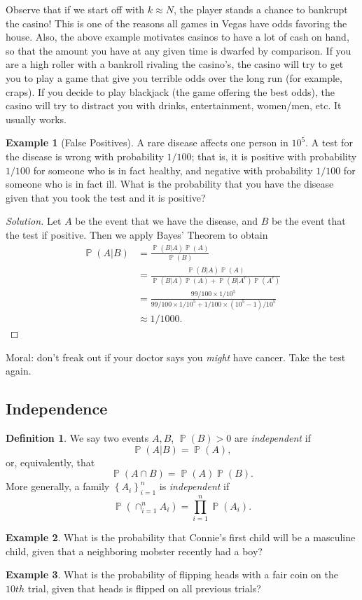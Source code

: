 \documentclass[12pt]{article}
\DeclareMathOperator{\prob}{\mathbb{P}}
\theoremstyle{plain}
\theoremstyle{definition}
\newtheorem*{definition}{Definition}
\newtheorem*{example}{Example}
\theoremstyle{remark}
\numberwithin{equation}{section}  %
\begin{document}
Observe that if we start off with $k \approx N$, the player stands a chance to
bankrupt the casino! This is one of the reasons all games in Vegas have odds
favoring the house. Also, the above example motivates casinos to have a lot of
cash on hand, so that the amount you have at any given time is dwarfed by
comparison. If you are a high roller with a bankroll rivaling the casino's,
the casino will try to get you to play a game that give you terrible odds over
the long run (for example, craps). If you decide to play blackjack (the game
offering the best odds), the casino will try to distract you with drinks,
entertainment, women/men, etc. It usually works.
\begin{example}[False Positives]
	A rare disease affects one person in $10^5$. A test for the disease
	is wrong with probability $1/100$; that is, it is positive with probability
	$1/100$ for someone who is in fact healthy, and negative
	with probability $1/100$ for someone who is in fact ill. What is the 
	probability
	that you have the disease given that you took the test and it is positive?
\end{example}
\begin{proof}[Solution]
	Let $A$ be the event that we have the disease, and $B$ be the event
	that the test if positive. Then we apply
	Bayes' Theorem to obtain
	\begin{align*}
		\prob(A | B) & = \frac{\prob(B | A) \prob(A)}{\prob(B)}
		\\
		& = \frac{\prob(B | A) \prob(A)}{\prob(B|A) \prob(A) + \prob(B | A^c)
	\prob(A^c)}
	\\
	& = \frac{99/100 \times 1/10^5}{99/100 \times 1/10^5 + 1/100 \times 
	(10^5 -
1)/10^5}
\\
& \approx 1/1000.
	\end{align*}
\end{proof}
Moral: don't freak out if your doctor says you \emph{might} have
cancer. Take the test again.
\subsection{Independence}
\begin{definition}
	We say two events $A, B$, $\prob(B) > 0$ are \emph{independent} if 
	\[\prob(A |
	B) = \prob(A),\] or, equivalently, that \[\prob(A \cap B) = \prob(A) 
	\prob(B).\] More generally,
	a family $ {\left\{ A_i \right\}}_{i = 1}^n $ is
	\emph{independent} if 
	\[ \prob(\cap_{i = 1}^n A_i) = \prod_{i = 1}^n \prob(A_i).\]
\end{definition}
\begin{example}
	What is the probability that Connie's first child will be a masculine child,
	given that a neighboring mobster recently had a boy?
\end{example}
\begin{example}
	What is the probability of flipping heads with a fair coin on the $10th$ 
	trial,
	given that heads is flipped on all previous trials?
\end{example}
\end{document}
